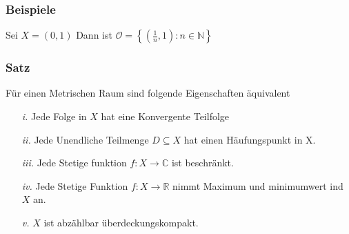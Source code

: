 \documentclass{article}
\newcommand{\satz}[1]{\subsubsection*{Satz {#1}}}
\newcommand{\beispiel}[1]{\subsubsection*{Beispiele {#1}}}
\begin{document}
\beispiel{} Sei $X=(0,1)$ Dann ist $\mathcal{O}=\left\lbrace(\frac{1}{n},1):n\in \mathbb{N}\right\rbrace$ 
\satz{}
Für einen Metrischen Raum sind folgende Eigenschaften äquivalent
\begin{itemize}
\item[\textit{i.}]{ Jede Folge in $X$ hat eine Konvergente Teilfolge}
\item[\textit{ii.}]{Jede Unendliche Teilmenge $D\subseteq X$ hat einen Häufungspunkt in X.}
\item[\textit{iii.}]{Jede Stetige funktion $f:X \rightarrow \mathbb{C }$ ist beschränkt.}
\item[\textit{iv.}]{Jede Stetige Funktion $f: X \rightarrow \mathbb{R}$ nimmt Maximum und minimumwert ind $X$ an.}
\item[\textit{v.}]{$X$ ist abzählbar überdeckungskompakt.}
\end{itemize}
\end{document}
